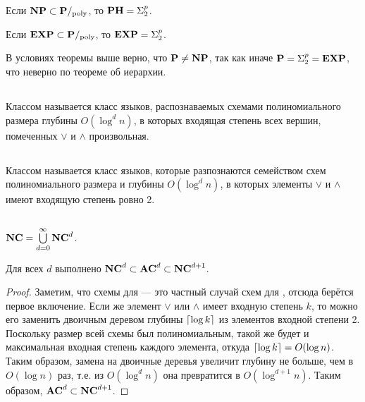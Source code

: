 \begin{theorem}
Если $\textbf{NP} \subset \textbf{P}/_{\mathrm{poly}}$, то $\textbf{PH} = \textbf{$\Sigma_{2}^p$}$.
\end{theorem}

\begin{theorem}[Мейера]
Если $\textbf{EXP} \subset \textbf{P}/_{\mathrm{poly}}$, то $\textbf{EXP} = \textbf{$\Sigma_{2}^p$}$.
\end{theorem}

\begin{note}
В условиях теоремы выше верно, что $\textbf{P} \ne \textbf{NP}$, так как иначе $\textbf{P} = \textbf{$\Sigma_{2}^p$} = \textbf{EXP}$, что неверно по теореме об иерархии.
\end{note}

\subsection{}

\begin{definition}
Классом  называется класс языков, распознаваемых схемами полиномиального размера глубины $O(\log^d n)$, в которых входящая степень всех вершин, помеченных $\lor$ и $\land$ произвольная.
\end{definition}

\subsection{}

\begin{definition}
Классом  называется класс языков, которые разпознаются семейством схем полиномиального размера и глубины $O(\log^d n)$, в которых элементы $\lor$ и $\land$ имеют входящую степень ровно 2.
\end{definition}

\subsection{\nc}

\begin{definition}
$\textbf{NC} = \bigcup\limits_{d=0}^\infty \textbf{$\mathbf{NC}^{d}$}$.
\end{definition}

\begin{statement}
Для всех $d$ выполнено $\textbf{$\mathbf{NC}^{d}$} \subset \textbf{$\mathbf{AC}^{d}$} \subset \textbf{$\mathbf{NC}^{d+1}$}$.
\end{statement}

\begin{proof}
Заметим, что схемы для  --- это частный случай схем для , отсюда берётся первое включение. Если же элемент $\lor$ или $\land$ имеет входную степень $k$, то можно его заменить двоичным деревом глубины $\left \lceil \log k \right \rceil$ из элементов входной степени 2. Поскольку размер всей схемы был полиномиальным, такой же будет и максимальная входная степень каждого элемента, откуда $\left \lceil \log k \right \rceil = O(\log n)$. Таким образом, замена на двоичные деревья увеличит глубину не больше, чем в $O(\log n)$ раз, т.е. из $O(\log^d n)$ она превратится в $O(\log^{d+1} n)$. Таким образом, $\textbf{$\mathbf{AC}^{d}$} \subset \textbf{$\mathbf{NC}^{d+1}$}$.
\end{proof}

